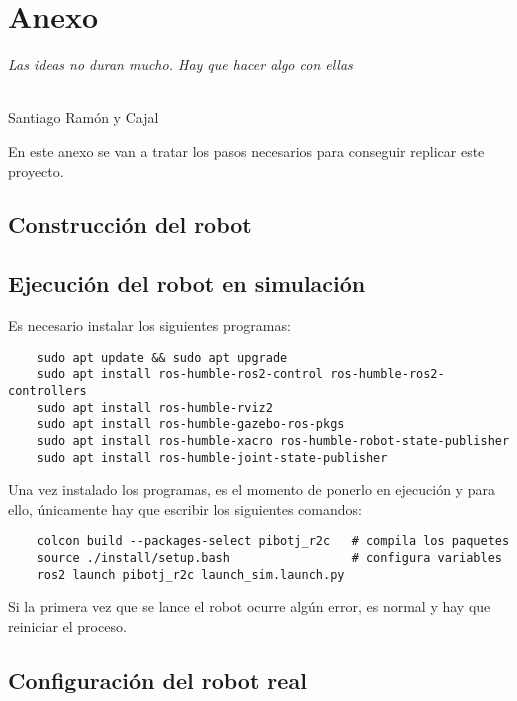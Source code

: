 \chapter{Anexo}
\label{cap:capitulo9}

\begin{flushright}
\begin{minipage}[]{10cm}
\emph{Las ideas no duran mucho. Hay que hacer algo con ellas}\\
\end{minipage}\\

Santiago Ramón y Cajal\\
\end{flushright}

\vspace{1cm}

En este anexo se van a tratar los pasos necesarios para conseguir replicar este proyecto.

\section{Construcción del robot} 



\section{Ejecución del robot en simulación}

Es necesario instalar los siguientes programas: 

\begin{verbatim}
	sudo apt update && sudo apt upgrade
	sudo apt install ros-humble-ros2-control ros-humble-ros2-controllers
	sudo apt install ros-humble-rviz2
	sudo apt install ros-humble-gazebo-ros-pkgs
	sudo apt install ros-humble-xacro ros-humble-robot-state-publisher 
	sudo apt install ros-humble-joint-state-publisher
\end{verbatim}
 
Una vez instalado los programas, es el momento de ponerlo en ejecución y para ello, únicamente hay que escribir los siguientes comandos:
\begin{verbatim}
	colcon build --packages-select pibotj_r2c   # compila los paquetes
	source ./install/setup.bash                 # configura variables 
	ros2 launch pibotj_r2c launch_sim.launch.py
\end{verbatim} 

Si la primera vez que se lance el robot ocurre algún error, es normal y hay que reiniciar el proceso.

\section{Configuración del robot real}

